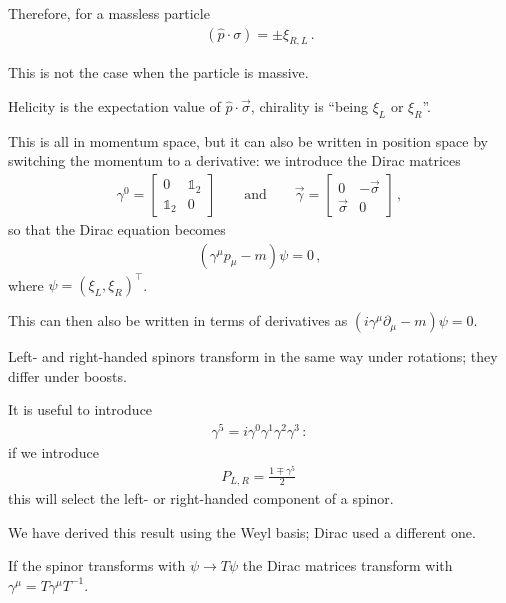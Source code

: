 \documentclass[main.tex]{subfiles}
\begin{document}
Therefore, for a massless particle 
%
\begin{align}
\left(\hat{p} \cdot \sigma \right) = \pm \xi _{R, L}
\,.
\end{align}

This is not the case when the particle is massive. 

Helicity is the expectation value of \(\hat{p} \cdot \vec{\sigma}\),
chirality is ``being \(\xi_{L}\) or \(\xi_R\)''. 

This is all in momentum space, but it can also be written in position space
by switching the momentum to a derivative: we introduce the Dirac matrices 
%
\begin{align}
\gamma^{0} = \left[\begin{array}{cc}
0 & \mathbb{1}_2 \\ 
\mathbb{1}_2 & 0
\end{array}\right]
\qquad \text{and} \qquad
\vec{\gamma} = \left[\begin{array}{cc}
0 & -\vec{\sigma} \\ 
\vec{\sigma} & 0
\end{array}\right]
\,,
\end{align}
%
so that the Dirac equation becomes 
%
\begin{align}
(\gamma^{\mu }p_\mu - m ) \psi = 0
\,,
\end{align}
%
where \(\psi = (\xi _L, \xi _R)^{\top}\). 

This can then also be written in terms of derivatives as \((i \gamma^{\mu } \partial_{\mu } - m) \psi = 0\).

Left- and right-handed spinors transform in the same way under rotations; they differ under boosts. 

It is useful to introduce 
%
\begin{align}
\gamma^{5} = i \gamma^{0} \gamma^{1} \gamma^{2} \gamma^{3}
\,:
\end{align}
%
if we introduce 
%
\begin{align}
P_{L, R} = \frac{1 \mp \gamma^{5}}{2}
\,
\end{align}
%
this will select the left- or right-handed component of a spinor.

We have derived this result using the Weyl basis; Dirac used a different one. 

If the spinor transforms with \(\psi \to T \psi \) the Dirac matrices transform with \(\gamma^{\mu } = T \gamma^{\mu } T^{-1}\). 
\end{document}
